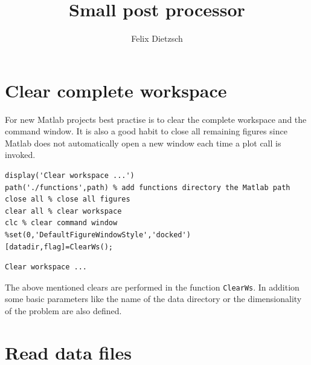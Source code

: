 \documentclass[preprint,12pt,ntfdMod]{elsarticle}
\author[rss]{Felix Dietzsch}
\title{Small post processor}
\begin{document}
		\maketitle 
		\tableofcontents

\section{Clear complete workspace}

\begin{par}
For new Matlab projects best practise is to clear the complete workspace and the command window. It is also a good habit to close all remaining figures since Matlab does not automatically open a new window each time a plot call is invoked.
\end{par} \vspace{1em}
\begin{verbatim}
display('Clear workspace ...')
path('./functions',path) % add functions directory the Matlab path
close all % close all figures
clear all % clear workspace
clc % clear command window
%set(0,'DefaultFigureWindowStyle','docked')
[datadir,flag]=ClearWs();
\end{verbatim}

        \color{lightgray} \begin{verbatim}Clear workspace ...
\end{verbatim} \color{black}
    \begin{par}

The above mentioned clears are performed in the function \verb|ClearWs|.
In addition some basic parameters like the name of the data
directory or the dimensionality of the problem are also defined.


\end{par} \vspace{1em}


\section{Read data files}
\end{document}
